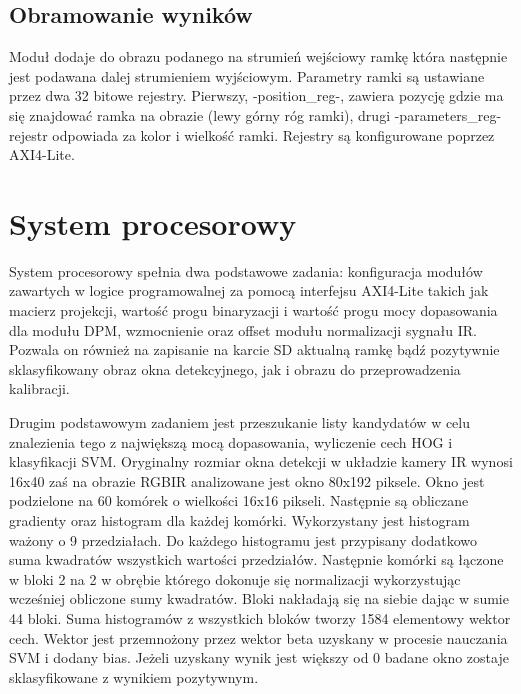 \subsection{Obramowanie wyników}
Moduł dodaje do obrazu podanego na strumień wejściowy ramkę która następnie jest podawana dalej strumieniem wyjściowym. Parametry ramki są ustawiane przez dwa 32 bitowe rejestry. Pierwszy, -position\_reg-, zawiera pozycję gdzie ma się znajdować ramka na obrazie (lewy górny róg ramki), drugi -parameters\_reg- rejestr odpowiada za kolor i wielkość ramki. Rejestry są konfigurowane poprzez AXI4-Lite.

\section{System procesorowy}

System procesorowy spełnia dwa podstawowe zadania: konfiguracja modułów zawartych w logice programowalnej za pomocą interfejsu AXI4-Lite takich jak macierz projekcji, wartość progu binaryzacji i wartość progu mocy dopasowania dla modułu DPM, wzmocnienie oraz offset modułu normalizacji sygnału IR. Pozwala on również na zapisanie na karcie SD aktualną ramkę bądź pozytywnie sklasyfikowany obraz okna detekcyjnego, jak i obrazu do przeprowadzenia kalibracji.

Drugim podstawowym zadaniem jest przeszukanie listy kandydatów w celu znalezienia tego z największą mocą dopasowania, wyliczenie cech HOG i klasyfikacji SVM. Oryginalny rozmiar okna detekcji w układzie kamery IR wynosi 16x40 zaś na obrazie RGBIR analizowane jest okno 80x192 piksele. Okno jest podzielone na 60 komórek o wielkości 16x16 pikseli. Następnie są obliczane gradienty oraz histogram dla każdej komórki. Wykorzystany jest histogram ważony o 9 przedziałach. Do każdego histogramu jest przypisany dodatkowo suma kwadratów wszystkich wartości przedziałów. Następnie komórki są łączone w bloki 2 na 2 w obrębie którego dokonuje się normalizacji wykorzystując wcześniej obliczone sumy kwadratów. Bloki nakładają się na siebie dając w sumie 44 bloki. Suma histogramów z wszystkich bloków tworzy 1584 elementowy wektor cech. Wektor jest przemnożony przez wektor beta uzyskany w procesie nauczania SVM i dodany bias. Jeżeli uzyskany wynik jest większy od 0 badane okno zostaje sklasyfikowane z wynikiem pozytywnym.

